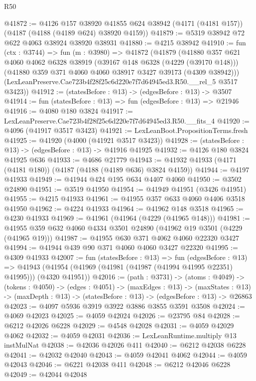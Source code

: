 \begin{lexlean}{R50}
\begin{coremodule}
@41872 := @4126
    @157
    @38920
    @41855
    @624
    @38942
    (@4171 (@4181 @157))
    (@4187 (@4188 (@4189 @624) @38920 @4159))
@41879 := @5319 @38942 @72 @622 @4063 @38924 @38920 @38931
@41880 := @4215 @38942
@41910 := fun (ctx : @3744) =>
  fun (m : @3980) =>
  @41872
    (@41879
      (@41880
        @357
        @621
        @4060
        @4062
        @6328
        @38919
        (@39167 @148 @6328 (@4229 (@39170 @148)))
        (@41880 @359 @371 @4060 @4060 @38917 @3427 @39173 (@4309 @38942)))
      (LexLeanPreserve.Cae723b4f28f25c6d220e7f7d64945ed3.R50.__rel_5 @3517 @3423))
@41912 := (statesBefore : @13) -> (edgesBefore : @13) -> @3507
@41914 := fun (statesBefore : @13) => fun (edgesBefore : @13) => @21946
@41916 := @4080 @180 @3824
@41917 := LexLeanPreserve.Cae723b4f28f25c6d220e7f7d64945ed3.R50.__fits_4
@41920 := @4096 (@41917 @3517 @3423)
@41921 := LexLeanBoot.PropositionTerms.fresh
@41925 := @41920 (@4000 (@41921 @3517 @3423))
@41928 := (statesBefore : @13) -> (edgesBefore : @13) -> @41916 @41925
@41932 := @4126 @180 @3824 @41925 @636
@41933 := @4686 @21779
@41943 := @41932 @41933 (@4171 (@4181 @180)) (@4187 (@4188 (@4189 @636) @3824 @4159))
@41944 := @4197 @41933
@41949 := @41944 @424 @195 @634 @4407 @4060
@41950 := @3502 @24890
@41951 := @3519 @41950
@41954 := @41949 @41951 (@3426 @41951)
@41955 := @4215 @41933
@41961 := @41955 @357 @633 @4060 @4406 @3518 @41950
@41962 := @4224 @41933
@41964 := @41962 @148 @3518
@41965 := @4230 @41933
@41969 := @41961 (@41964 (@4229 (@41965 @148)))
@41981 := @41955 @359 @632 @4060 @4334 @3501 @24890 (@41962 @19 @3501 (@4229 (@41965 @19)))
@41987 := @41955 @630 @371 @4062 @4060 @22320 @3427
@41994 := @41944 @439 @90 @371 @4060 @4060 @3427 @22320
@41995 := @4309 @41933
@42007 := fun (statesBefore : @13) =>
  fun (edgesBefore : @13) =>
  @41943 (@41954 (@41969 (@41981 (@41987 (@41994 @41995 @22351) @41995))) (@4320 @41951))
@42016 := (path : @3731) ->
  (atoms : @4049) ->
  (tokens : @4050) ->
  (edges : @4051) ->
  (maxEdges : @13) ->
  (maxStates : @13) -> (maxDepth : @13) -> (statesBefore : @13) -> (edgesBefore : @13) -> @26863
@42023 := @4097 @5936 @3919 @3922 @3886 @3855 @3591 @3508
@42024 := @4069 @42023
@42025 := @4059 @42024
@42026 := @23795 @84
@42028 := @6212 @42026 @6228
@42029 := @4548 @42028
@42031 := @4059 @42029 @4062
@42032 := @4059 @42031
@42036 := LexLeanRuntime.multiply @13 instMulNat
@42038 := @42036 @42026 @411
@42040 := @6212 @42038 @6228
@42041 := @42032 @42040
@42043 := @4059 @42041 @4062
@42044 := @4059 @42043
@42046 := @6221 @42038 @411
@42048 := @6212 @42046 @6228
@42049 := @42044 @42048

\end{coremodule}
\end{lexlean}

